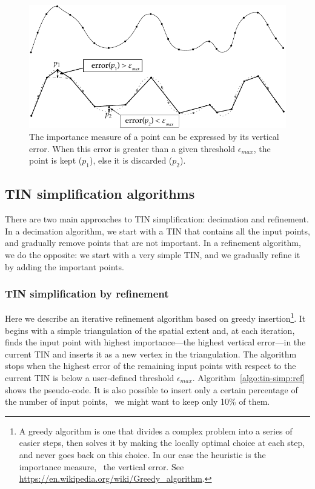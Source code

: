 \begin{figure}
	\centering
	\includegraphics[width=0.85\linewidth]{figs/mesh_simplification}
	\caption{The importance measure of a point can be expressed by its vertical error. When this error is greater than a given threshold $\epsilon_{max}$, the point is kept ($p_1$), else it is discarded ($p_2$).}
	\label{fig:meshsimplification}
\end{figure}


\subsection{TIN simplification algorithms}

There are two main approaches to TIN simplification: decimation and refinement. 
In a decimation algorithm, we start with a TIN that contains all the input points, and gradually remove points that are not important. 
In a refinement algorithm, we do the opposite: we start with a very simple TIN, and we gradually refine it by adding the important points. 


\subsubsection{TIN simplification by refinement}
Here we describe an iterative refinement algorithm based on greedy insertion\footnote{A greedy algorithm is one that divides a complex problem into a series of easier steps, then solves it by making the locally optimal choice at each step, and never goes back on this choice.
In our case the heuristic is the importance measure, \ie\ the vertical error. See \url{https://en.wikipedia.org/wiki/Greedy_algorithm}.}. 
It begins with a simple triangulation of the spatial extent and, at each iteration, finds the input point with highest importance---the highest vertical error---in the current TIN and inserts it as a new vertex in the triangulation. 
The algorithm stops when the highest error of the remaining input points with respect to the current TIN is below a user-defined threshold $\epsilon_{max}$. Algorithm~\ref{algo:tin-simp:ref} shows the pseudo-code.
It is also possible to insert only a certain percentage of the number of input points, \eg\ we might want to keep only 10\% of them.

